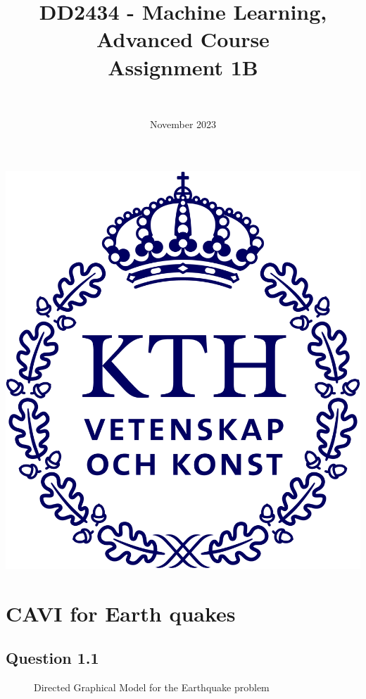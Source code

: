 \documentclass{article}
\title{DD2434 - Machine Learning, Advanced Course \\ Assignment 1B}
\author{\authorFst \\ \emailFst}
\date{November 2023}
\begin{document}
\maketitle

\begin{center}
  \includegraphics[scale=0.5]{KTH_logo_RGB_bla.png}
\end{center}

\thispagestyle{empty}

\newpage
\tableofcontents
\newpage

\section{CAVI for Earth quakes}

\subsection{Question 1.1}

\begin{figure}[H]
  \centering
  
  \label{fig:fig1}
  \caption{Directed Graphical Model for the Earthquake problem}
\end{figure}
\end{document}
